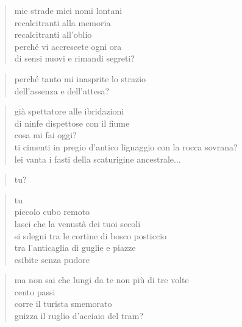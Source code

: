 \begin{verse}
    mie strade miei nomi lontani\\
    recalcitranti alla memoria\\
    recalcitranti all'oblio\\
    perché vi accrescete ogni ora\\
    di sensi nuovi e rimandi segreti?
\end{verse}

\begin{verse}
    perché tanto mi inasprite lo strazio\\
    dell'assenza e dell'attesa?
\end{verse}

\clearpage


\begin{verse}
    già spettatore alle ibridazioni\\
    di ninfe dispettose con il fiume\\
    cosa mi fai oggi?\\
    ti cimenti in pregio d'antico lignaggio con la rocca sovrana?\\
    lei vanta i fasti della scaturigine ancestrale...
\end{verse}

\begin{verse}
    tu?
\end{verse}

\begin{verse}
    tu\\
    piccolo cubo remoto\\
    lasci che la venustà dei tuoi secoli\\
    si sdegni tra le cortine di bosco posticcio\\
    tra l’anticaglia di guglie e piazze\\
    esibite senza pudore
\end{verse}

\begin{verse}
    ma non sai che lungi da te non più di tre volte\\
    cento passi\\
    corre il turista smemorato\\
    guizza il ruglio d'acciaio del tram?
\end{verse}

\clearpage


